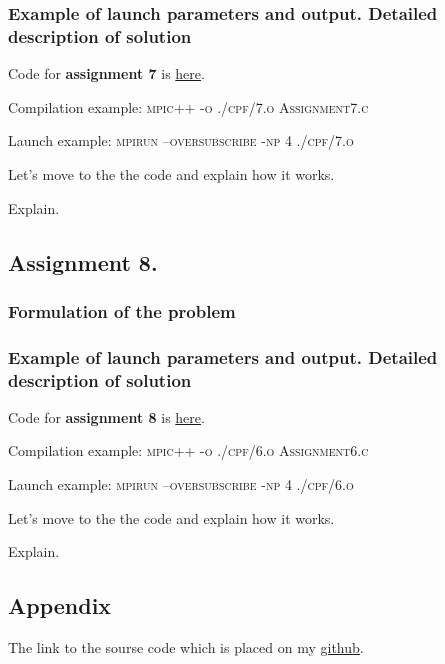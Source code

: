 \documentclass[%
12pt, %
final, %
oneside, %
onecolumn, %
centertags]{article} %
\theoremstyle{plain}
\theoremstyle{definition}
\theoremstyle{remark}
\begin{document}
\subsubsection{Example of launch parameters and output. Detailed description of solution}

Code for \textbf{assignment 7} is \href{https:\//github.com/aptmess/parallel_algorithms/blob/master/HT/hw_mpi/Assignment7.c}{here}.

Compilation example: \textsc{mpic++ -o ./cpf/7.o Assignment7.c}

Launch example: \textsc{mpirun --oversubscribe -np 4 ./cpf/7.o}


Let's move to the the code and explain how it works.



Explain. 

\newpage
\subsection{Assignment 8.}

\subsubsection{Formulation of the problem}



\subsubsection{Example of launch parameters and output. Detailed description of solution}

Code for \textbf{assignment 8} is \href{https:\//github.com/aptmess/parallel_algorithms/blob/master/HT/hw_mpi/Assignment8.c}{here}.

Compilation example: \textsc{mpic++ -o ./cpf/6.o Assignment6.c}

Launch example: \textsc{mpirun --oversubscribe -np 4 ./cpf/6.o}


Let's move to the the code and explain how it works.



Explain. 



\subsection{Appendix}

The link to the sourse code which is placed on my \href{https://github.com/aptmess/parallel_algorithms}{github}.
\end{document}
